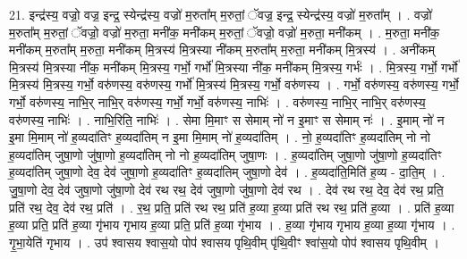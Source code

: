 \documentclass[17pt]{extarticle}
\begin{document}
21. इन्द्र॑स्य॒ वज्रो॒ वज्र॒ इन्द्र॒ स्येन्द्र॑स्य॒ वज्रो॑ म॒रुता᳚म् म॒रुतां॒ ॅवज्र॒ इन्द्र॒ स्येन्द्र॑स्य॒ वज्रो॑ म॒रुता᳚म् । . वज्रो॑ म॒रुता᳚म् म॒रुतां॒ ॅवज्रो॒ वज्रो॑ म॒रुता॒ मनी॑क॒ मनी॑कम् म॒रुतां॒ ॅवज्रो॒ वज्रो॑ म॒रुता॒ मनी॑कम् । . म॒रुता॒ मनी॑क॒ मनी॑कम् म॒रुता᳚म् म॒रुता॒ मनी॑कम् मि॒त्रस्य॑ मि॒त्रस्या नी॑कम् म॒रुता᳚म् म॒रुता॒ मनी॑कम् मि॒त्रस्य॑ । . अनी॑कम् मि॒त्रस्य॑ मि॒त्रस्या नी॑क॒ मनी॑कम् मि॒त्रस्य॒ गर्भो॒ गर्भो॑ मि॒त्रस्या नी॑क॒ मनी॑कम् मि॒त्रस्य॒ गर्भः॑ । . मि॒त्रस्य॒ गर्भो॒ गर्भो॑ मि॒त्रस्य॑ मि॒त्रस्य॒ गर्भो॒ वरु॑णस्य॒ वरु॑णस्य॒ गर्भो॑ मि॒त्रस्य॑ मि॒त्रस्य॒ गर्भो॒ वरु॑णस्य । . गर्भो॒ वरु॑णस्य॒ वरु॑णस्य॒ गर्भो॒ गर्भो॒ वरु॑णस्य॒ नाभि॒र् नाभि॒र् वरु॑णस्य॒ गर्भो॒ गर्भो॒ वरु॑णस्य॒ नाभिः॑ । . वरु॑णस्य॒ नाभि॒र् नाभि॒र् वरु॑णस्य॒ वरु॑णस्य॒ नाभिः॑ । . नाभि॒रिति॒ नाभिः॑ । . सेमा मि॒माꣳ स सेमाम् नो॑ न इ॒माꣳ स सेमाम् नः॑ । . इ॒माम् नो॑ न इ॒मा मि॒माम् नो॑ ह॒व्यदा॑तिꣳ ह॒व्यदा॑तिम् न इ॒मा मि॒माम् नो॑ ह॒व्यदा॑तिम् । . नो॒ ह॒व्यदा॑तिꣳ ह॒व्यदा॑तिम् नो नो ह॒व्यदा॑तिम् जुषा॒णो जु॑षा॒णो ह॒व्यदा॑तिम् नो नो ह॒व्यदा॑तिम् जुषा॒णः । . ह॒व्यदा॑तिम् जुषा॒णो जु॑षा॒णो ह॒व्यदा॑तिꣳ ह॒व्यदा॑तिम् जुषा॒णो देव॒ देव॑ जुषा॒णो ह॒व्यदा॑तिꣳ ह॒व्यदा॑तिम् जुषा॒णो देव॑ । . ह॒व्यदा॑ति॒मिति॑ ह॒व्य - दा॒ति॒म् । . जु॒षा॒णो देव॒ देव॑ जुषा॒णो जु॑षा॒णो देव॑ रथ रथ॒ देव॑ जुषा॒णो जु॑षा॒णो देव॑ रथ । . देव॑ रथ रथ॒ देव॒ देव॑ रथ॒ प्रति॒ प्रति॑ रथ॒ देव॒ देव॑ रथ॒ प्रति॑ । . र॒थ॒ प्रति॒ प्रति॑ रथ रथ॒ प्रति॑ ह॒व्या ह॒व्या प्रति॑ रथ रथ॒ प्रति॑ ह॒व्या । . प्रति॑ ह॒व्या ह॒व्या प्रति॒ प्रति॑ ह॒व्या गृ॑भाय गृभाय ह॒व्या प्रति॒ प्रति॑ ह॒व्या गृ॑भाय । . ह॒व्या गृ॑भाय गृभाय ह॒व्या ह॒व्या गृ॑भाय । . गृ॒भा॒येति॑ गृभाय । . उप॑ श्वासय श्वास॒यो पोप॑ श्वासय पृथि॒वीम् पृ॑थि॒वीꣳ श्वा॑स॒यो पोप॑ श्वासय पृथि॒वीम् । \newline
\end{document}
